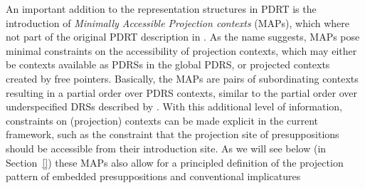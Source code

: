 An important addition to the representation structures in PDRT is the
introduction of \textit{Minimally Accessible Projection contexts} (MAPs),
which where not part of the original PDRT description in
. As the name suggests, MAPs pose minimal
constraints on the accessibility of projection contexts, which may either be
contexts available as PDRSs in the global PDRS, or projected contexts
created by free pointers.  Basically, the MAPs are pairs of subordinating
contexts resulting in a partial order over PDRS contexts, similar to the
partial order over underspecified DRSs described by
 \citeyear{reyle1993dealing,reyle1995reasoning}.
With this additional level of information, constraints on (projection)
contexts can be made explicit in the current framework, such as the
constraint that the projection site of presuppositions should be accessible
from their introduction site. As we will see below (in Section~\ref{}) these
MAPs also allow for a principled definition of the projection pattern of
embedded presuppositions and conventional implicatures



